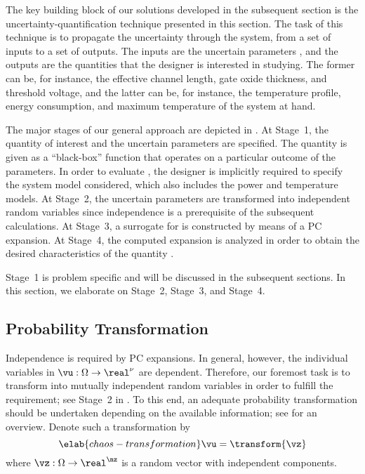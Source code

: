 The key building block of our solutions developed in the subsequent section is
the uncertainty-quantification technique presented in this section. The task of
this technique is to propagate the uncertainty through the system, from a set of
inputs to a set of outputs. The inputs are the uncertain parameters \vu, and the
outputs are the quantities that the designer is interested in studying. The
former can be, for instance, the effective channel length, gate oxide thickness,
and threshold voltage, and the latter can be, for instance, the temperature
profile, energy consumption, and maximum temperature of the system at hand.

The major stages of our general approach are depicted in .
At Stage~1, the quantity of interest \g and the uncertain parameters \vu are
specified. The quantity is given as a ``black-box'' function that operates on a
particular outcome of the parameters. In order to evaluate \g, the designer is
implicitly required to specify the system model considered, which also includes
the power and temperature models. At Stage~2, the uncertain parameters \vu are
transformed into independent random variables \vz since independence is a
prerequisite of the subsequent calculations. At Stage~3, a surrogate for \g is
constructed by means of a \ac{PC} expansion. At Stage~4, the computed expansion
is analyzed in order to obtain the desired characteristics of the quantity \g.

Stage~1 is problem specific and will be discussed in the subsequent sections. In
this section, we elaborate on Stage~2, Stage~3, and Stage~4.

\subsection{Probability Transformation}

Independence is required by \ac{PC} expansions. In general, however, the \nu
individual variables in $\vu: \Omega \to \real^\nu$ are dependent. Therefore,
our foremost task is to transform \vu into mutually independent random variables
in order to fulfill the requirement; see Stage~2 in . To
this end, an adequate probability transformation should be undertaken depending
on the available information; see \cite{eldred2008} for an overview. Denote such
a transformation by
\begin{equation} \elab{chaos-transformation}
  \vu = \transform{\vz}
\end{equation}
where $\vz: \Omega \to \real^\nz$ is a random vector with \nz independent
components.

